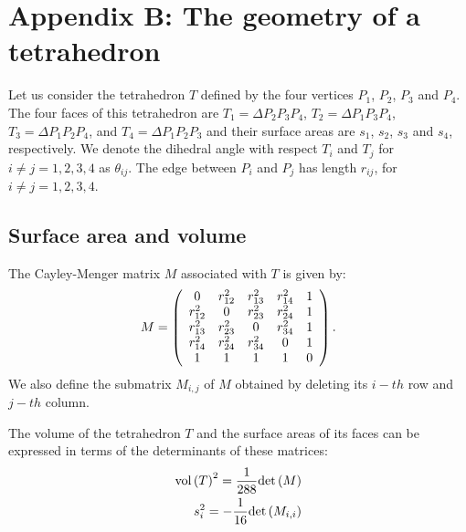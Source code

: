 \documentclass[11 pt]{article}
\newcommand {\mm}[1] {\ifmmode{#1}\else{\mbox{\(#1\)}}\fi}
\theoremstyle{plain} \theorembodyfont{\rmfamily}
\newcommand{\Volume}[1]     {\mm{\rm vol\,}{#1}}
\newcommand{\Deter}[1]       {\mm{\rm det\,}{#1}}
\begin{document}
\renewcommand{\theequation}{B.\arabic{equation}} 
 \setcounter{equation}{0} 

\section*{Appendix B: The geometry of a tetrahedron}

 Let us consider the tetrahedron $T$ defined by the four vertices $P_1$, $P_2$, $P_3$ and $P_4$. The four faces of this tetrahedron are $T_1=\Delta P_2P_3P_4$, $T_2 = \Delta P_1P_3P_4$, $T_3 = \Delta P_1P_2P_4$, and $T_4 = \Delta P_1P_2P_3$ and their surface areas are $s_1$, $s_2$, $s_3$ and $s_4$, respectively. We denote the dihedral angle with respect $T_i$ and $T_j$ for $i \neq j = 1,2,3,4$ as $\theta_{ij}$.  The edge between $P_i$ and $P_j$ has length $r_{ij}$, for $i \neq j = 1,2,3,4$.
 
 \subsection*{Surface area and volume}
 
 The Cayley-Menger matrix $M$ associated with $T$ is given by:
 \begin{eqnarray}
 M =
\left (
 \begin{array}{c c c c c}
0 & r_{12}^2 &  r_{13}^2  & r_{14}^2 &1\\
r_{12}^2 & 0 &  r_{23}^2  & r_{24}^2 &1\\
r_{13}^2 & r_{23}^2 &  0  & r_{34}^2 &1\\
 r_{14}^2 & r_{24}^2 &  r_{34}^2  & 0 &1\\
 1 & 1 & 1 & 1 & 0
\end{array}
 \right) .
 \end{eqnarray}
 We also define the submatrix $M_{i,j}$ of $M$ obtained by deleting its $i-th$ row and $j-th$ column.

 The volume of the tetrahedron $T$ and the surface areas of its faces can be expressed in terms of the determinants of these matrices:
 \begin{eqnarray}
 \Volume{(T)}^2 = \frac{1}{288} \Deter{(M)} \label{eqn:voltet} \\
 s_i^2 = - \frac{1}{16} \Deter{(M_{i,i})} \label{eqn:volsurftet}
 \end{eqnarray}
 
\end{document}
